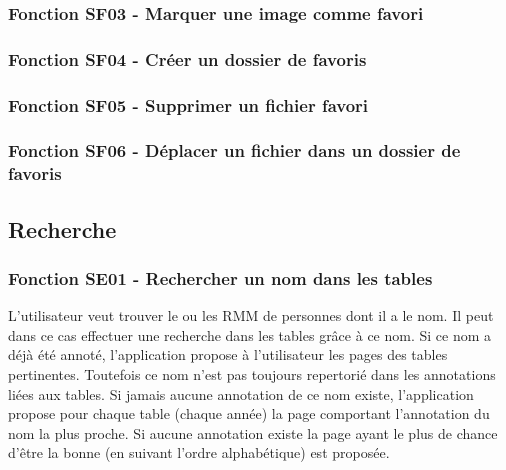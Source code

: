 \documentclass[a4paper]{article}
\begin{document}
\subsubsection{Fonction SF03 - Marquer une image comme favori}
\subsubsection{Fonction SF04 - Créer un dossier de favoris}
\subsubsection{Fonction SF05 - Supprimer un fichier favori}
\subsubsection{Fonction SF06 - Déplacer un fichier dans un dossier de favoris}


\subsection{Recherche}

\subsubsection{Fonction SE01 - Rechercher un nom dans les tables}

L'utilisateur veut trouver le ou les RMM de personnes dont il a le nom. Il peut dans ce cas effectuer une recherche dans les tables grâce à ce nom. Si ce nom a déjà été annoté, l'application propose à l'utilisateur les pages des tables pertinentes. Toutefois ce nom n'est pas toujours repertorié dans les annotations liées aux tables. Si jamais aucune annotation de ce nom existe, l'application propose pour chaque table (chaque année) la page comportant l'annotation du nom la plus proche. Si aucune annotation existe la page ayant le plus de chance d'être la bonne (en suivant l'ordre alphabétique) est proposée.
\\
\end{document}
